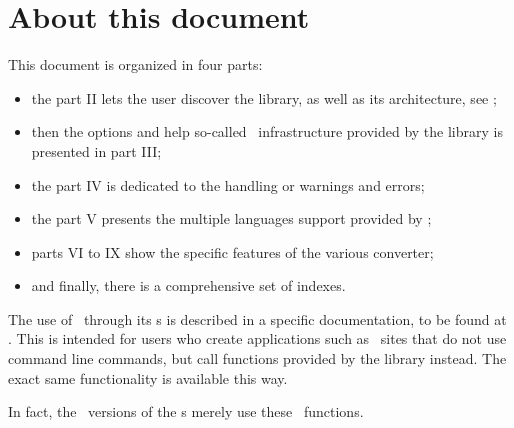 
\chapter{About this document}

This document is organized in four parts:
\begin{itemize}
\item the part II lets the user discover the library, as well as its architecture, see ;
\item then the options and help so-called \oahRepr\ infrastructure provided by the library is presented in part III;
\item the part IV is dedicated to the handling or warnings and errors;
\item the part V presents the multiple languages support provided by \mf;
\item parts VI to IX show the specific features of the various converter;
\item and finally, there is a comprehensive set of indexes.
\end{itemize}

The use of \mf\ through its \API s is described in a specific documentation, to be found at . This is intended for users who create applications such as \Web\ sites that do not use command line commands, but call functions provided by the library instead. The exact same functionality is available this way.

In fact, the \CLI\ versions of the \service s merely use these \API\ functions.

